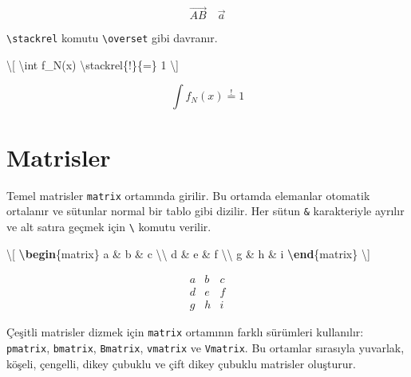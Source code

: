 \documentclass[
  10pt,
]{scrbook}
\newenvironment{Shaded}{}{}
\newcommand{\ExtensionTok}[1]{#1}
\newcommand{\KeywordTok}[1]{\textcolor[rgb]{0.00,0.44,0.13}{\textbf{#1}}}
\newcommand{\NormalTok}[1]{#1}
\newcommand{\SpecialCharTok}[1]{\textcolor[rgb]{0.25,0.44,0.63}{#1}}
\newcommand{\SpecialStringTok}[1]{\textcolor[rgb]{0.73,0.40,0.53}{#1}}
\theoremstyle{definition}
\theoremstyle{definition}
\theoremstyle{definition}
\theoremstyle{definition}
\theoremstyle{remark}
\begin{document}
\[
\overrightarrow{AB} \quad \vec{a}
\]

\texttt{\textbackslash{}stackrel} komutu \texttt{\textbackslash{}overset} gibi davranır.

\begin{Shaded}
\begin{Highlighting}[]
\SpecialStringTok{\textbackslash{}[}
\SpecialCharTok{\textbackslash{}int}\SpecialStringTok{ f\_N(x) }\SpecialCharTok{\textbackslash{}stackrel}\SpecialStringTok{\{!\}\{=\} 1}
\SpecialStringTok{\textbackslash{}]}
\end{Highlighting}
\end{Shaded}

\[
\int f_N(x) \stackrel{!}{=} 1
\]

\hypertarget{matrisler}{%
\section{Matrisler}\label{matrisler}}

Temel matrisler \texttt{matrix} ortamında girilir. Bu ortamda elemanlar otomatik ortalanır ve sütunlar normal bir tablo gibi dizilir. Her sütun \texttt{\&} karakteriyle ayrılır ve alt satıra geçmek için \texttt{\textbackslash{}} komutu verilir.

\begin{Shaded}
\begin{Highlighting}[]
\SpecialStringTok{\textbackslash{}[}
\KeywordTok{\textbackslash{}begin}\NormalTok{\{}\ExtensionTok{matrix}\NormalTok{\}}
\SpecialStringTok{a \& b \& c }\SpecialCharTok{\textbackslash{}\textbackslash{}}
\SpecialStringTok{d \& e \& f }\SpecialCharTok{\textbackslash{}\textbackslash{}}
\SpecialStringTok{g \& h \& i}
\KeywordTok{\textbackslash{}end}\NormalTok{\{}\ExtensionTok{matrix}\NormalTok{\}}
\SpecialStringTok{\textbackslash{}]}
\end{Highlighting}
\end{Shaded}

\[
\begin{matrix}
a & b & c \\
d & e & f \\
g & h & i
\end{matrix}
\]

Çeşitli matrisler dizmek için \texttt{matrix} ortamının farklı sürümleri kullanılır: \texttt{pmatrix}, \texttt{bmatrix}, \texttt{Bmatrix}, \texttt{vmatrix} ve \texttt{Vmatrix}. Bu ortamlar sırasıyla yuvarlak, köşeli, çengelli, dikey çubuklu ve çift dikey çubuklu matrisler oluşturur.
\end{document}
